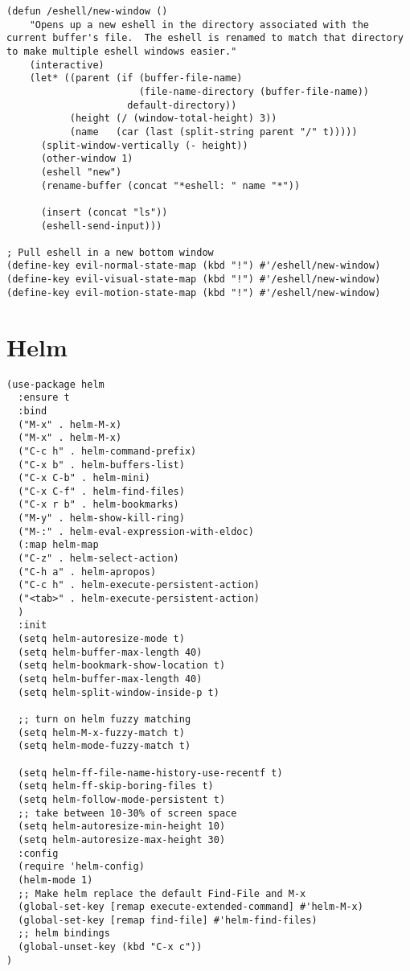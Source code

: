\documentclass[11pt]{article}
\begin{document}
\begin{verbatim}
(defun /eshell/new-window ()
    "Opens up a new eshell in the directory associated with the current buffer's file.  The eshell is renamed to match that directory to make multiple eshell windows easier."
    (interactive)
    (let* ((parent (if (buffer-file-name)
                       (file-name-directory (buffer-file-name))
                     default-directory))
           (height (/ (window-total-height) 3))
           (name   (car (last (split-string parent "/" t)))))
      (split-window-vertically (- height))
      (other-window 1)
      (eshell "new")
      (rename-buffer (concat "*eshell: " name "*"))

      (insert (concat "ls"))
      (eshell-send-input)))

; Pull eshell in a new bottom window
(define-key evil-normal-state-map (kbd "!") #'/eshell/new-window)
(define-key evil-visual-state-map (kbd "!") #'/eshell/new-window)
(define-key evil-motion-state-map (kbd "!") #'/eshell/new-window)
\end{verbatim}

\section*{Helm}
\label{sec:org717f631}

\begin{verbatim}
(use-package helm
  :ensure t
  :bind
  ("M-x" . helm-M-x)
  ("M-x" . helm-M-x)
  ("C-c h" . helm-command-prefix)
  ("C-x b" . helm-buffers-list)
  ("C-x C-b" . helm-mini)
  ("C-x C-f" . helm-find-files)
  ("C-x r b" . helm-bookmarks)
  ("M-y" . helm-show-kill-ring)
  ("M-:" . helm-eval-expression-with-eldoc)
  (:map helm-map
  ("C-z" . helm-select-action)
  ("C-h a" . helm-apropos)
  ("C-c h" . helm-execute-persistent-action)
  ("<tab>" . helm-execute-persistent-action)
  )
  :init
  (setq helm-autoresize-mode t)
  (setq helm-buffer-max-length 40)
  (setq helm-bookmark-show-location t)
  (setq helm-buffer-max-length 40)
  (setq helm-split-window-inside-p t)

  ;; turn on helm fuzzy matching
  (setq helm-M-x-fuzzy-match t)
  (setq helm-mode-fuzzy-match t)

  (setq helm-ff-file-name-history-use-recentf t)
  (setq helm-ff-skip-boring-files t)
  (setq helm-follow-mode-persistent t)
  ;; take between 10-30% of screen space
  (setq helm-autoresize-min-height 10)
  (setq helm-autoresize-max-height 30)
  :config
  (require 'helm-config)
  (helm-mode 1)
  ;; Make helm replace the default Find-File and M-x
  (global-set-key [remap execute-extended-command] #'helm-M-x)
  (global-set-key [remap find-file] #'helm-find-files)
  ;; helm bindings
  (global-unset-key (kbd "C-x c"))
)
\end{verbatim}
\end{document}
